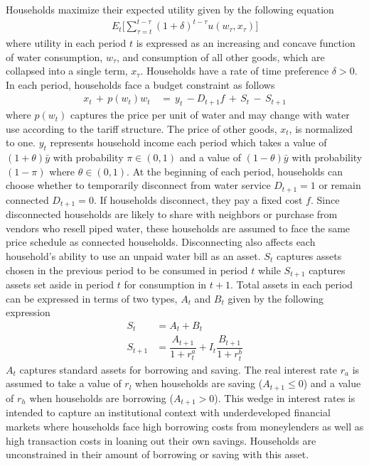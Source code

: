 \documentclass[12pt]{article}
\begin{document}
Households maximize their expected utility given by the following equation
\begin{align}\label{eq:u}
E_t \Big[ \sum_{\tau = t}^{t-\tau} (1+\delta)^{t-\tau} u(w_{\tau},x_{\tau})   \Big]
\end{align}
where utility in each period $t$ is expressed as an increasing and concave function of water consumption, $w_{\tau}$, and consumption of all other goods, which are collapsed into a single term, $x_{\tau}$.  Households have a rate of time preference $\delta>0$.  In each period, households face a budget constraint as follows
\begin{align}\label{eq:bc}
x_t \, + \, p(w_t) w_t \, &= \, y_t \, - D_{t+1} f  \, + \, S_t \, - \, S_{t+1}
\end{align}
where $p(w_t)$ captures the price per unit of water and may change with water use according to the tariff structure.  The price of other goods, $x_t$, is normalized to one.  $y_t$ represents household income each period which takes a value of $(1+\theta)\bar{y}$ with probability $\pi \in (0,1)$ and a value of $(1-\theta)\bar{y}$ with probability $(1-\pi)$ where $\theta  \in (0,1)$.  At the beginning of each period, households can choose whether to temporarily disconnect from water service $D_{t+1}=1$ or remain connected $D_{t+1}=0$.  If households disconnect, they pay a fixed cost $f$.  Since disconnected households are likely to share with neighbors or purchase from vendors who resell piped water, these households are assumed to face the same price schedule as connected households.  Disconnecting also affects each household's ability to use an unpaid water bill as an asset.  $S_t$ captures assets chosen in the previous period to be consumed in period $t$ while $S_{t+1}$ captures assets set aside in period $t$ for consumption in $t+1$.  Total assets in each period can be expressed in terms of two types, $A_t$ and $B_t$ given by the following expression
\begin{align}
S_t &= A_t + B_t \\
S_{t+1} &=  \dfrac{A_{t+1}}{1+r^{a}_{t}}  + I_t \dfrac{B_{t+1}}{1+r^{b}_{t}} 
\end{align}
$A_t$ captures standard assets for borrowing and saving.  The real interest rate $r_a$ is assumed to take a value of $r_l$ when households are saving ($A_{t+1} \leq 0$) and a value of $r_h$ when households are borrowing ($A_{t+1} > 0$).  This wedge in interest rates is intended to capture an institutional context with underdeveloped financial markets where households face high borrowing costs from moneylenders as well as high transaction costs in loaning out their own savings.  Households are unconstrained in their amount of borrowing or saving with this asset.  %
\end{document}
